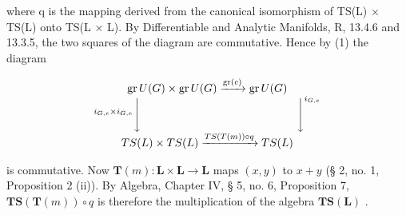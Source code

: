 where q is the mapping derived from the canonical isomorphism of TS(L) × TS(L) onto TS(L × L). By Differentiable and Analytic Manifolds, R, 13.4.6 and 13.3.5, the two squares of the diagram are commutative. Hence by (1) the diagram

\[
\begin{array}{c} \operatorname{gr} U (G) \times \operatorname{gr} U (G) \xrightarrow {\operatorname{gr} (c)} \operatorname{gr} U (G) \\ ^ {i _ {G, e} \times i _ {G, e}} \Biggl \downarrow \qquad \qquad \qquad \qquad \qquad \qquad \qquad \Biggl \downarrow^ {i _ {G, e}} \\ T S (L) \times T S (L) \xrightarrow {T S (T (m)) \circ q} T S (L) \end{array}
\]

is commutative. Now \(\mathbf{T}(m): \mathbf{L} \times \mathbf{L} \to \mathbf{L}\) maps \((x, y)\) to \(x + y\) (§ 2, no. 1, Proposition 2 (ii)). By Algebra, Chapter IV, § 5, no. 6, Proposition 7, \(\mathbf{TS}(\mathbf{T}(m)) \circ q\) is therefore the multiplication of the algebra \(\mathbf{TS}(\mathbf{L})\) .

